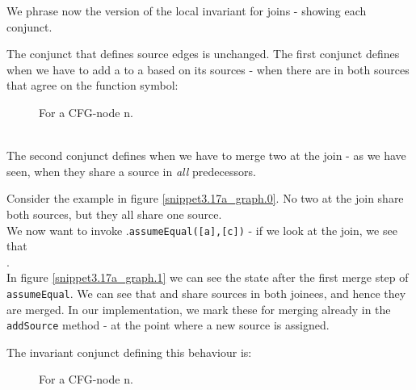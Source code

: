 \bigskip
\noindent
We phrase now the version of the local invariant for joins - showing each conjunct.

The conjunct that defines source edges is unchanged.
The first conjunct defines when we have to add a \GFA{} to a \GT{} based on its sources - when there are \GFAs{} in both sources that agree on the function symbol:
\begin{figure}[H]
For a CFG-node n.\\
\\
\end{figure}

\noindent
The second conjunct defines when we have to merge two \GTs{} at the join - as we have seen, when they share a source in \emph{all} predecessors.

\noindent
Consider the example in figure \ref{snippet3.17a_graph.0}.
No two \GTs{} at the join share both sources, but they all share one source.\\
We now want to invoke .\lstinline|assumeEqual([a],[c])| - if we look at the join, we see that\\ .\\
 In figure \ref{snippet3.17a_graph.1} we can see the state after the first merge step of \lstinline|assumeEqual|.
We can see that  and  share sources in both joinees, and hence they are merged.
In our implementation, we mark these \GTs{} for merging already in the 
\lstinline|addSource| method - at the point where a new source is assigned.

\noindent
The invariant conjunct defining this behaviour is:
\begin{figure}[H]
For a CFG-node n.\\
\\
\end{figure}


